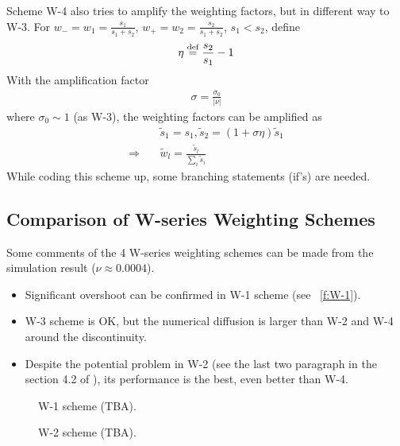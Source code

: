 \documentclass{turgon}
\begin{document}
Scheme W-4 also tries to amplify the weighting factors, but in different way to
W-3.  For $w_- = w_1 = \frac{s_1}{s_1+s_2}$, $w_+ = w_2 = \frac{s_2}{s_1+s_2}$,
$s_1<s_2$, define
\begin{align}
  \eta \defeq \frac{s_2}{s_1} - 1 \label{e:W4_eta}
\end{align}
With the amplification factor
\begin{align}
  \sigma = \frac{\sigma_0}{|\nu|} \label{e:W4_sigma}
\end{align}
where $\sigma_0 \sim 1$ (as W-3), the weighting factors can be amplified
as
\begin{align}
 &\tilde{s}_1 = s_1, \tilde{s}_2 = (1+\sigma\eta)\tilde{s}_1
  \label{e:W4_s} \\
  \Rightarrow\quad &\tilde{w}_l = \frac{\tilde{s}_l}{\sum_i\tilde{s}_i}
  \label{e:W4_w}
\end{align}
While coding this scheme up, some branching statements (if's) are needed.
\citep[See also][Eq.(4.35), (4.37), (4.38), (4.39), (4.46)]%
{chang_multi-dimensional_2003}

\subsection{Comparison of W-series Weighting Schemes}

Some comments of the 4 W-series weighting schemes can be made from the
simulation result ($\nu\approx0.0004$).
\begin{itemize}
  \item Significant overshoot can be
        confirmed \citep{chang_multi-dimensional_2003} in W-1 scheme (see
        \figurename~\ref{f:W-1}).
  \item W-3 scheme is OK, but the numerical diffusion is larger than W-2 and
        W-4 around the discontinuity.
  \item Despite the potential problem in W-2 (see the last two paragraph in the
        section 4.2 of \citep{chang_multi-dimensional_2003}), its performance is
        the best, even better than W-4.
\end{itemize}

\begin{figure}[htbp]
  \centering
  \caption{W-1 scheme (TBA).}
  \label{f:W-1}
  \caption{W-2 scheme (TBA).}
  \label{f:W-2}
\end{figure}
\end{document}
